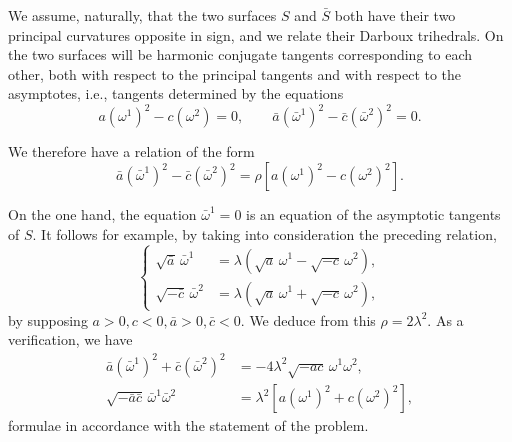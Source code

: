 \documentclass[leqno,11pt]{book}
\numberwithin{equation}{chapter}
\theoremstyle{shape1}
\theoremstyle{shape0}
\theoremstyle{shape2}
\theoremstyle{definition}
\begin{document}
\fsec We assume, naturally, that the two surfaces $S$ and $\bar S$ both have their two principal curvatures opposite in sign, and we relate their Darboux trihedrals. On the two surfaces will be harmonic conjugate tangents corresponding to each other, both with respect to the principal tangents and with respect to the asymptotes, i.e., tangents determined by the equations
\[
a(\omega^{1})^{2}-c(\omega^{2})=0,\qquad \bar a(\bar \omega^{1})^{2}-\bar c(\bar\omega^{2})^{2}=0.
\]

We therefore have a relation of the form
\[
\bar a (\bar \omega^{1})^{2}-\bar c(\bar \omega^{2})^{2}=\rho[a(\omega^{1})^{2}-c(\omega^{2})^{2}].
\]

On the one hand, the equation $\bar \omega^{1}=0$ is an equation of the asymptotic tangents of $S$. It follows for example, by taking into consideration the preceding relation,
\begin{equation}
  \label{eq:7.XIV.1}\tag{XIV, 1}
  \left\{
    \begin{aligned}
      \sqrt{\bar a}\,\bar\omega^{1}&=\lambda(\sqrt{a}\,\omega^{1}-\sqrt{-c}\,\omega^{2}),\\
      \sqrt{-\bar c}\,\bar\omega^{2}&=\lambda(\sqrt{a}\,\omega^{1}+\sqrt{-c}\,\omega^{2}),
    \end{aligned}
  \right.
\end{equation}
by supposing $a>0,c<0,\bar a>0,\bar c<0$. We deduce from this $\rho=2\lambda^{2}$. As a verification, we have
\begin{align*}
  \bar a(\bar\omega^{1})^{2}+\bar c(\bar \omega^{2})^{2}&=-4\lambda^{2}\sqrt{-ac}\,\omega^{1}\omega^{2},\\
  \sqrt{-\bar{a}\bar{c}}\,\bar\omega^{1}\bar\omega^{2}&=\lambda^{2}[a(\omega^{1})^{2}+c(\omega^{2})^{2}],
\end{align*}
formulae in accordance with the statement of the problem.
\end{document}
